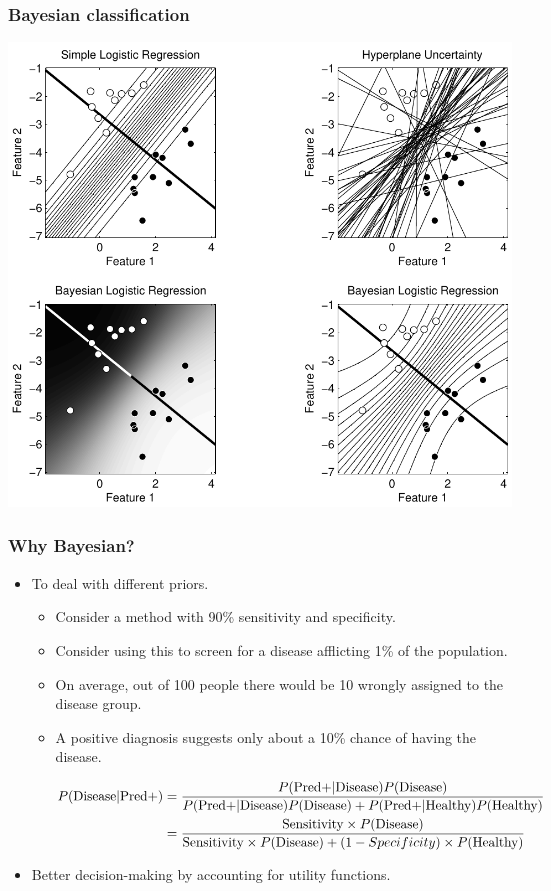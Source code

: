 \begin{frame}
\frametitle{Bayesian classification}
\begin{center}
\includegraphics[height=.8\textheight]{logistic_regr}
\end{center}
\end{frame}

\begin{frame}
\frametitle{Why Bayesian?}
\begin{itemize}
\item To deal with different priors.
\begin{itemize}
\item Consider a method with 90\% sensitivity and specificity.
\item Consider using this to screen for a disease afflicting 1\% of the population.
\item On average, out of 100 people there would be 10 wrongly assigned to the disease group.
\item A positive diagnosis suggests only about a 10\% chance of having the disease.
{\small
\begin{eqnarray*}
P(\text{Disease} | \text{Pred+}) & = \frac{P(\text{Pred+} | \text{Disease}) P(\text{Disease})}{P(\text{Pred+} | \text{Disease}) P(\text{Disease}) + P(\text{Pred+} | \text{Healthy}) P(\text{Healthy})}\cr
 & = \frac{\text{Sensitivity} \times P(\text{Disease})}{\text{Sensitivity} \times P(\text{Disease}) + (1-Specificity) \times P(\text{Healthy})}
\end{eqnarray*}
\par
}
\end{itemize}
\item Better decision-making by accounting for utility functions.
\end{itemize}
\end{frame}

